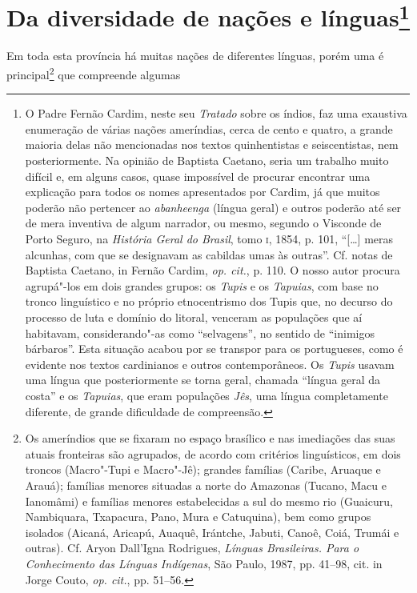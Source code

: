\section[Da diversidade de nações e línguas \medskip]{Da diversidade de nações e línguas\protect\footnote[*]{ \MakeUppercase{O}
\MakeUppercase{P}adre \MakeUppercase{F}ernão \MakeUppercase{C}ardim, neste seu \textit{\MakeUppercase{T}ratado} sobre os índios, faz
uma exaustiva enumeração de várias nações ameríndias, cerca de cento e
quatro, a grande maioria delas não mencionadas nos textos quinhentistas
e seiscentistas, nem posteriormente. \MakeUppercase{N}a opinião de \MakeUppercase{B}aptista \MakeUppercase{C}aetano,
seria um trabalho muito difícil e, em alguns casos, quase impossível de
procurar encontrar uma explicação para todos os nomes apresentados por
\MakeUppercase{C}ardim, já que muitos poderão não pertencer ao \textit{abanheenga}
(língua geral) e outros poderão até ser de mera inventiva de algum
narrador, ou mesmo, segundo o \MakeUppercase{V}isconde de \MakeUppercase{P}orto \MakeUppercase{S}eguro, na
\textit{\MakeUppercase{H}istória \MakeUppercase{G}eral do \MakeUppercase{B}rasil}, tomo \textsc{i}, 1854, p. 101, ``[\ldots{}] meras
alcunhas, com que se designavam as cabildas umas às outras''. \MakeUppercase{C}f.
notas de \MakeUppercase{B}aptista \MakeUppercase{C}aetano, in \MakeUppercase{F}ernão \MakeUppercase{C}ardim, \textit{op. cit.}, p. 110.
\MakeUppercase{O} nosso autor procura agrupá"-los em dois grandes grupos: os
\textit{\MakeUppercase{T}upis} e os \textit{\MakeUppercase{T}apuias}, com base no tronco linguístico e no
próprio etnocentrismo dos \MakeUppercase{T}upis que, no decurso do processo de luta e
domínio do litoral, venceram as populações que aí habitavam,
considerando"-as como ``selvagens'', no sentido de ``inimigos bárbaros''. 
\MakeUppercase{E}sta situação acabou por se transpor para os portugueses, como é
evidente nos textos cardinianos e outros contemporâneos. \MakeUppercase{O}s
\textit{\MakeUppercase{T}upis} usavam uma língua que posteriormente se torna geral,
chamada ``língua geral da costa'' e os \textit{\MakeUppercase{T}apuias}, que eram
populações \textit{\MakeUppercase{J}ês}, uma língua completamente diferente, de grande
dificuldade de compreensão.}} 
 Em toda esta província há muitas nações de diferentes línguas, porém
uma é principal\footnote{ Os ameríndios que se fixaram no espaço
brasílico e nas imediações das suas atuais fronteiras são agrupados,
de acordo com critérios linguísticos, em dois troncos (Macro"-Tupi e
Macro"-Jê); grandes famílias (Caribe, Aruaque e Arauá); famílias menores
situadas a norte do Amazonas (Tucano, Macu e Ianomâmi) e famílias
menores estabelecidas a sul do mesmo rio (Guaicuru, Nambiquara,
Txapacura, Pano, Mura e Catuquina), bem como grupos isolados (Aicaná,
Aricapú, Auaquê, Irántche, Jabuti, Canoê, Coiá, Trumái e outras). Cf.
Aryon Dall'Igna Rodrigues, \textit{Línguas Brasileiras. Para o
Conhecimento das Línguas Indígenas}, São Paulo, 1987, pp. 41--98, cit.
in Jorge Couto, \textit{op. cit.}, pp. 51--56.} que compreende algumas
